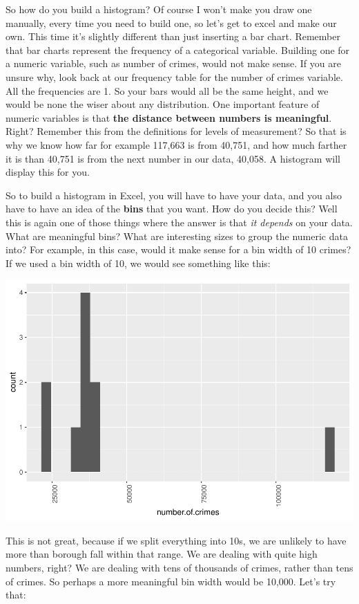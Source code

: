 \documentclass[
]{book}
\begin{document}
So how do you build a histogram? Of course I won't make you draw one manually, every time you need to build one, so let's get to excel and make our own. This time it's slightly different than just inserting a bar chart. Remember that bar charts represent the frequency of a categorical variable. Building one for a numeric variable, such as number of crimes, would not make sense. If you are unsure why, look back at our frequency table for the number of crimes variable. All the frequencies are 1. So your bars would all be the same height, and we would be none the wiser about any distribution. One important feature of numeric variables is that \textbf{the distance between numbers is meaningful}. Right? Remember this from the definitions for levels of measurement? So that is why we know how far for example 117,663 is from 40,751, and how much farther it is than 40,751 is from the next number in our data, 40,058. A histogram will display this for you.

So to build a histogram in Excel, you will have to have your data, and you also have to have an idea of the \textbf{bins} that you want. How do you decide this? Well this is again one of those things where the answer is that \emph{it depends} on your data. What are meaningful bins? What are interesting sizes to group the numeric data into? For example, in this case, would it make sense for a bin width of 10 crimes? If we used a bin width of 10, we would see something like this:

\includegraphics{bookdown-demo_files/figure-latex/unnamed-chunk-20-1.pdf}

This is not great, because if we split everything into 10s, we are unlikely to have more than borough fall within that range. We are dealing with quite high numbers, right? We are dealing with tens of thousands of crimes, rather than tens of crimes. So perhaps a more meaningful bin width would be 10,000. Let's try that:
\end{document}
